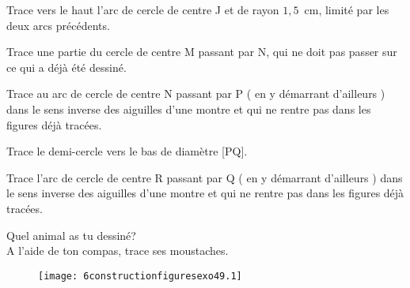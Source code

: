 \begin{myenumerate}
\vspace{0.2cm}	
  \item Trace vers le haut l'arc de cercle de centre J et de rayon $1,5$~cm, limité par les deux arcs précédents.
\vspace{0.2cm}
  \item Trace une partie du cercle de centre M passant par N, qui ne doit pas passer sur ce qui a déjà été dessiné.
\vspace{0.2cm}
  \item Trace au arc de cercle de centre N passant par P ( en y démarrant d'ailleurs ) dans le sens inverse des aiguilles d'une montre et qui ne rentre pas dans les figures déjà tracées.
\vspace{0.2cm}  
   \item Trace le demi-cercle vers le bas de diamètre [PQ].
\vspace{0.2cm}
   \item Trace l'arc de cercle de centre R passant par Q ( en y démarrant d'ailleurs ) dans le sens inverse des aiguilles d'une montre et qui ne rentre pas dans les figures déjà tracées.
\vspace{0.2cm}
   \item Quel animal as tu dessiné? \dotfill
        \\ A l'aide de ton compas, trace ses moustaches.
\end{myenumerate}
\newpage
\begin{figure}[b] 
\begin{center}
\texttt{[image: 6constructionfiguresexo49.1]}
\end{center}
\end{figure}